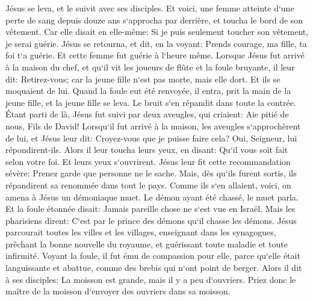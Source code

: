 \verse Jésus se leva, et le suivit avec ses disciples. 
\verse Et voici, une femme atteinte d`une perte de sang depuis douze ans s`approcha par derrière, et toucha le bord de son vêtement. 
\verse Car elle disait en elle-même: Si je puis seulement toucher son vêtement, je serai guérie. 
\verse Jésus se retourna, et dit, en la voyant: Prends courage, ma fille, ta foi t`a guérie. Et cette femme fut guérie à l`heure même. 
\verse Lorsque Jésus fut arrivé à la maison du chef, et qu`il vit les joueurs de flûte et la foule bruyante, 
\verse il leur dit: Retirez-vous; car la jeune fille n`est pas morte, mais elle dort. Et ils se moquaient de lui. 
\verse Quand la foule eut été renvoyée, il entra, prit la main de la jeune fille, et la jeune fille se leva. 
\verse Le bruit s`en répandit dans toute la contrée. 
\verse Étant parti de là, Jésus fut suivi par deux aveugles, qui criaient: Aie pitié de nous, Fils de David! 
\verse Lorsqu`il fut arrivé à la maison, les aveugles s`approchèrent de lui, et Jésus leur dit: Croyez-vous que je puisse faire cela? Oui, Seigneur, lui répondirent-ils. 
\verse Alors il leur toucha leurs yeux, en disant: Qu`il vous soit fait selon votre foi. 
\verse Et leurs yeux s`ouvrirent. Jésus leur fit cette recommandation sévère: Prenez garde que personne ne le sache. 
\verse Mais, dès qu`ils furent sortis, ils répandirent sa renommée dans tout le pays. 
\verse Comme ils s`en allaient, voici, on amena à Jésus un démoniaque muet. 
\verse Le démon ayant été chassé, le muet parla. Et la foule étonnée disait: Jamais pareille chose ne s`est vue en Israël. 
\verse Mais les pharisiens dirent: C`est par le prince des démons qu`il chasse les démons. 
\verse Jésus parcourait toutes les villes et les villages, enseignant dans les synagogues, prêchant la bonne nouvelle du royaume, et guérissant toute maladie et toute infirmité. 
\verse Voyant la foule, il fut ému de compassion pour elle, parce qu`elle était languissante et abattue, comme des brebis qui n`ont point de berger. 
\verse Alors il dit à ses disciples: La moisson est grande, mais il y a peu d`ouvriers. 
\verse Priez donc le maître de la moisson d`envoyer des ouvriers dans sa moisson. 

